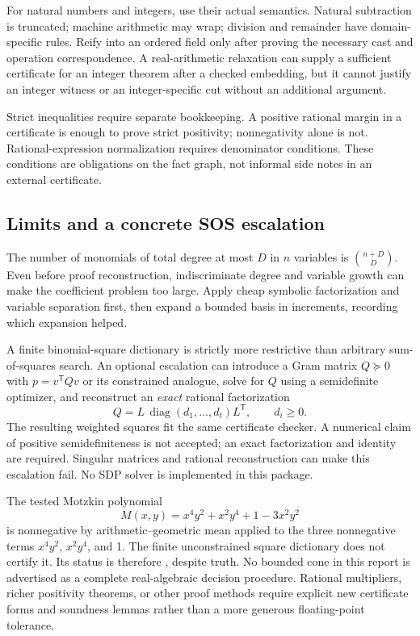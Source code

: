 For natural numbers and integers, use their actual semantics. Natural
subtraction is truncated; machine arithmetic may wrap; division and remainder
have domain-specific rules. Reify into an ordered field only after proving the
necessary cast and operation correspondence. A real-arithmetic relaxation can
supply a sufficient certificate for an integer theorem after a checked
embedding, but it cannot justify an integer witness or an integer-specific cut
without an additional argument.

Strict inequalities require separate bookkeeping. A positive rational margin
in a certificate is enough to prove strict positivity; nonnegativity alone is
not. Rational-expression normalization requires denominator conditions. These
conditions are obligations on the fact graph, not informal side notes in an
external certificate.

\subsection{Limits and a concrete SOS escalation}

The number of monomials of total degree at most $D$ in $n$ variables is
$\binom{n+D}{D}$. Even before proof reconstruction, indiscriminate degree and
variable growth can make the coefficient problem too large. Apply cheap
symbolic factorization and variable separation first, then expand a bounded
basis in increments, recording which expansion helped.

A finite binomial-square dictionary is strictly more restrictive than arbitrary
sum-of-squares search. An optional escalation can introduce a Gram matrix
$Q\succeq0$ with $p=v^{\mathsf T}Qv$ or its constrained analogue, solve for $Q$
using a semidefinite optimizer, and reconstruct an \emph{exact} rational
factorization
\[
 Q=L\,\operatorname{diag}(d_1,\ldots,d_t)L^{\mathsf T},\qquad d_i\geq0.
\]
The resulting weighted squares fit the same certificate checker. A numerical
claim of positive semidefiniteness is not accepted; an exact factorization and
identity are required. Singular matrices and rational reconstruction can make
this escalation fail. No SDP solver is implemented in this package.

The tested Motzkin polynomial
\[
 M(x,y)=x^4y^2+x^2y^4+1-3x^2y^2
\]
is nonnegative by arithmetic--geometric mean applied to the three nonnegative
terms $x^4y^2$, $x^2y^4$, and 1. The finite unconstrained square dictionary does
not certify it. Its status is therefore , despite truth. No
bounded cone in this report is advertised as a complete real-algebraic decision
procedure. Rational multipliers, richer positivity theorems, or other proof
methods require explicit new certificate forms and soundness lemmas rather
than a more generous floating-point tolerance.

